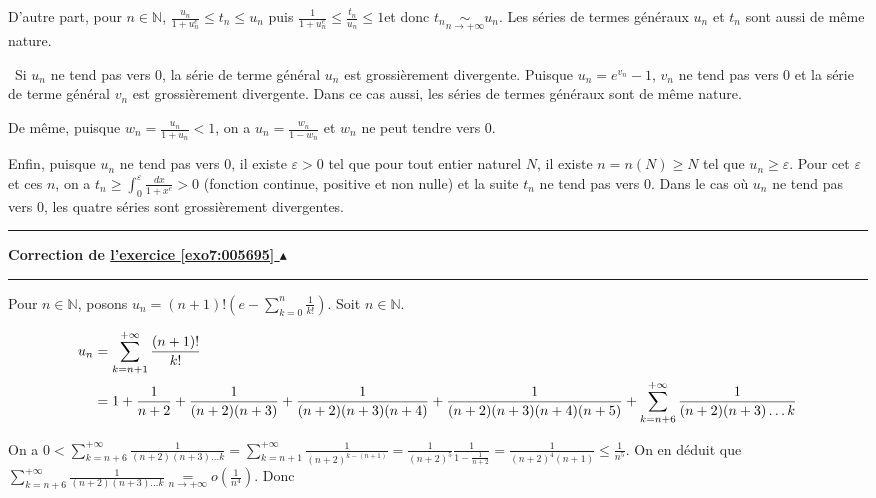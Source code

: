 \documentclass[11pt,a4paper]{article}
\newcommand{\Nn}{\mathbb{N}} \newcommand{\N}{\mathbb{N}}
\renewcommand{\epsilon}{\varepsilon}
\newcounter{exo}
\newcommand{\correction}[1]{\hypertarget{cor7:#1}{}\label{cor7:#1}{\bf Correction de \hyperlink{exo7:#1}{l'exercice \ref{exo7:#1} $\blacktriangle$}}\vspace{1mm}\hrule\vspace{1mm}}
\newcommand{\fincorrection}{\vspace{1mm}\hrule\vspace*{7mm}}
\begin{document}
D'autre part, pour $n\in\Nn$, $\frac{u_n}{1+u_n^e}\leqslant t_n\leqslant u_n$ puis $\frac{1}{1+u_n^e}\leqslant\frac{t_n}{u_n}\leqslant1$et donc $t_n\underset{n\rightarrow+\infty}{\sim}u_n$. Les séries de termes généraux $u_n$ et $t_n$ sont aussi de même nature.

\textbullet~Si $u_n$ ne tend pas vers $0$, la série de terme général $u_n$ est grossièrement divergente. Puisque $u_n =e^{v_n}-1$, $v_n$ ne tend pas vers $0$ et la série de terme général $v_n$ est grossièrement divergente. Dans ce cas aussi, les séries de termes généraux sont de même nature.

De même, puisque $w_n=\frac{u_n}{1+u_n}<1$, on a $u_n =\frac{w_n}{1-w_n}$ et $w_n$ ne peut tendre vers $0$.

Enfin, puisque $u_n$ ne tend pas vers $0$, il existe $\varepsilon> 0$ tel que pour tout entier naturel $N$, il existe $n = n(N)\geqslant N$ tel que $u_n\geqslant\varepsilon$. Pour cet $\epsilon$ et ces $n$, on a $t_n\geqslant\int_{0}^{\varepsilon}\frac{dx}{1+x^e}>0$ (fonction continue, positive et non nulle) et la suite $t_n$ ne tend pas vers $0$. Dans le cas où $u_n$ ne tend pas vers $0$, les quatre séries sont grossièrement divergentes.

\fincorrection
\correction{005695}
Pour $n\in\Nn$, posons $u_n= (n+1)!\left(e-\sum_{k=0}^{n}\frac{1}{k!}\right)$. Soit $n\in\Nn$.

\begin{align*}\ensuremath
u_n&=\sum_{k=n+1}^{+\infty}\frac{(n+1)!}{k!}\\
 &=1+\frac{1}{n+2}+\frac{1}{(n+2)(n+3)}+\frac{1}{(n+2)(n+3)(n+4)}+\frac{1}{(n+2)(n+3)(n+4)(n+5)}+\sum_{k=n+6}^{+\infty}\frac{1}{(n+2)(n+3)\ldots k}
\end{align*}
	

On a $0 <\sum_{k=n+6}^{+\infty}\frac{1}{(n+2)(n+3)\ldots k}=\sum_{k=n+1}^{+\infty}\frac{1}{(n+2)^{k-(n+1)}}=\frac{1}{(n+2)^5}\frac{1}{1-\frac{1}{n+2}}=\frac{1}{(n+2)^4(n+1)}\leqslant\frac{1}{n^5}$. On en déduit que $\sum_{k=n+6}^{+\infty}\frac{1}{(n+2)(n+3)\ldots k}\underset{n\rightarrow+\infty}{=}o\left(\frac{1}{n^4}\right)$. Donc
\end{document}
